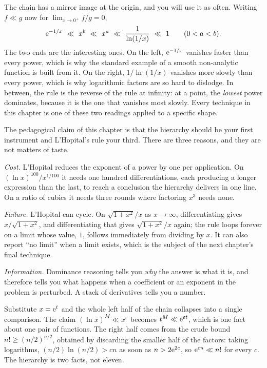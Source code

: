 The chain has a mirror image at the origin, and you will use it as often. Writing $f\ll g$ now for $\lim_{x\to0^{+}}f/g=0$,
\[
\eu^{-1/x}\ \ll\ x^{b}\ \ll\ x^{a}\ \ll\ \frac{1}{\ln(1/x)}\ \ll\ 1\qquad(0<a<b).
\]
The two ends are the interesting ones. On the left, $\mathrm{e}^{-1/x}$ vanishes faster than every power, which is why the standard example of a smooth non-analytic function is built from it. On the right, $1/\ln(1/x)$ vanishes more slowly than every power, which is why logarithmic factors are so hard to dislodge. In between, the rule is the reverse of the rule at infinity: at a point, the \emph{lowest} power dominates, because it is the one that vanishes most slowly. Every technique in this chapter is one of these two readings applied to a specific shape.

The pedagogical claim of this chapter is that the hierarchy should be your first instrument and L'Hopital's rule your third. There are three reasons, and they are not matters of taste.

\emph{Cost.} L'Hopital reduces the exponent of a power by one per application. On $(\ln x)^{100}/x^{1/100}$ it needs one hundred differentiations, each producing a longer expression than the last, to reach a conclusion the hierarchy delivers in one line. On a ratio of cubics it needs three rounds where factoring $x^{3}$ needs none.

\emph{Failure.} L'Hopital can cycle. On $\sqrt{1+x^{2}}/x$ as $x\to\infty$, differentiating gives $x/\sqrt{1+x^{2}}$, and differentiating that gives $\sqrt{1+x^{2}}/x$ again; the rule loops forever on a limit whose value, $1$, follows immediately from dividing by $x$. It can also report ``no limit'' when a limit exists, which is the subject of the next chapter's final technique.

\emph{Information.} Dominance reasoning tells you \emph{why} the answer is what it is, and therefore tells you what happens when a coefficient or an exponent in the problem is perturbed. A stack of derivatives tells you a number.

\begin{keynote}
Substitute $x=\mathrm{e}^{t}$ and the whole left half of the chain collapses into a single comparison. The claim $(\ln x)^{M}\ll x^{\varepsilon}$ becomes $t^{M}\ll \mathrm{e}^{\varepsilon t}$, which is one fact about one pair of functions. The right half comes from the crude bound $n!\geq(n/2)^{n/2}$, obtained by discarding the smaller half of the factors: taking logarithms, $(n/2)\ln(n/2)>cn$ as soon as $n>2\mathrm{e}^{2c}$, so $\mathrm{e}^{cn}\ll n!$ for every $c$. The hierarchy is two facts, not eleven.
\end{keynote}

